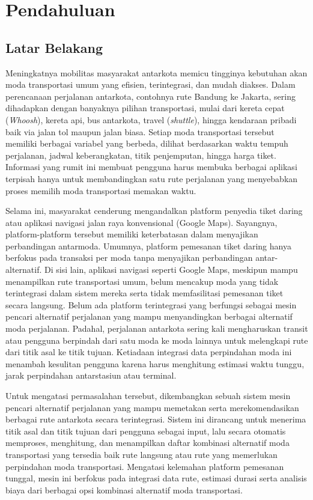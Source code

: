 \chapter{Pendahuluan}
\label{chap:intro}
   
\section{Latar Belakang}
\label{sec:label}

Meningkatnya mobilitas masyarakat antarkota memicu tingginya kebutuhan akan moda transportasi umum yang efisien, terintegrasi, dan mudah diakses. Dalam perencanaan perjalanan antarkota, contohnya rute Bandung ke Jakarta, sering dihadapkan dengan banyaknya pilihan transportasi, mulai dari kereta cepat ({\it Whoosh}), kereta api, bus antarkota, travel ({\it shuttle}), hingga kendaraan pribadi baik via jalan tol maupun jalan biasa. Setiap moda transportasi tersebut memiliki berbagai variabel yang berbeda, dilihat berdasarkan waktu tempuh perjalanan, jadwal keberangkatan, titik penjemputan, hingga harga tiket. Informasi yang rumit ini membuat pengguna harus membuka berbagai aplikasi terpisah hanya untuk membandingkan satu rute perjalanan yang menyebabkan proses memilih moda transportasi memakan waktu.
	
	Selama ini, masyarakat cenderung mengandalkan platform penyedia tiket daring atau aplikasi navigasi jalan raya konvensional (Google Maps). Sayangnya, platform-platform tersebut memiliki keterbatasan dalam menyajikan perbandingan antarmoda. Umumnya, platform pemesanan tiket daring hanya berfokus pada transaksi per moda tanpa menyajikan perbandingan antar-alternatif. Di sisi lain, aplikasi navigasi seperti Google Maps, meskipun mampu menampilkan rute transportasi umum, belum mencakup moda yang tidak terintegrasi dalam sistem mereka serta tidak memfasilitasi pemesanan tiket secara langsung. Belum ada platform terintegrasi yang berfungsi sebagai mesin pencari alternatif perjalanan yang mampu menyandingkan berbagai alternatif moda perjalanan. Padahal, perjalanan antarkota sering kali mengharuskan transit atau pengguna berpindah dari satu moda ke moda lainnya untuk melengkapi rute dari titik asal ke titik tujuan. Ketiadaan integrasi data perpindahan moda ini menambah kesulitan pengguna karena harus menghitung estimasi waktu tunggu, jarak perpindahan antarstasiun atau terminal.
	
	Untuk mengatasi permasalahan tersebut, dikembangkan sebuah sistem mesin pencari alternatif perjalanan yang mampu memetakan serta merekomendasikan berbagai rute antarkota secara terintegrasi. Sistem ini dirancang untuk menerima titik asal dan titik tujuan dari pengguna sebagai input, lalu secara otomatis memproses, menghitung, dan menampilkan daftar kombinasi alternatif moda transportasi yang tersedia baik rute langsung atau rute yang memerlukan perpindahan moda transportasi. Mengatasi kelemahan platform pemesanan tunggal, mesin ini berfokus pada integrasi data rute, estimasi durasi serta analisis biaya dari berbagai opsi kombinasi alternatif moda transportasi.
	
